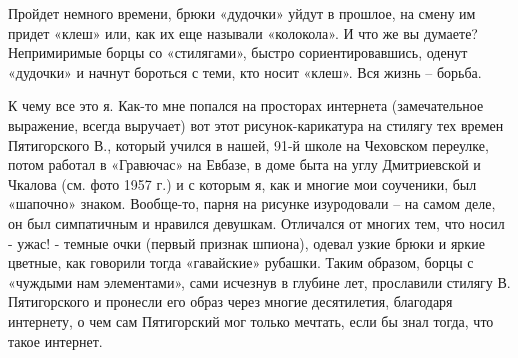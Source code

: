 Пройдет немного времени, брюки «дудочки» уйдут в прошлое, на смену им придет
«клеш» или, как их еще называли «колокола». И что же вы думаете? Непримиримые
борцы со «стилягами», быстро сориентировавшись, оденут «дудочки» и начнут
бороться с теми, кто носит «клеш». Вся жизнь – борьба.

К чему все это я. Как-то мне попался на просторах интернета (замечательное
выражение, всегда выручает) вот этот рисунок-карикатура на стилягу тех времен
Пятигорского В., который учился в нашей, 91-й школе на Чеховском переулке,
потом работал в «Гравючас» на Евбазе, в доме быта на углу Дмитриевской и
Чкалова (см. фото 1957 г.) и с которым я, как и многие мои соученики, был
«шапочно» знаком. Вообще-то, парня на рисунке изуродовали – на самом деле, он
был симпатичным и нравился девушкам. Отличался от многих тем, что носил - ужас!
- темные очки (первый признак шпиона), одевал узкие брюки и яркие цветные, как
говорили тогда «гавайские» рубашки. Таким образом, борцы с «чуждыми нам
элементами», сами исчезнув в глубине лет, прославили стилягу В. Пятигорского и
пронесли его образ через многие десятилетия, благодаря интернету, о чем сам
Пятигорский мог только мечтать, если бы знал тогда, что такое интернет.

